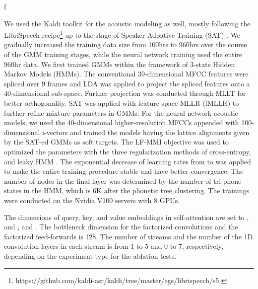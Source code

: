 f\documentclass{article}
\begin{document}
We used the Kaldi toolkit for the acoustic modeling as well, mostly following the LibriSpeech recipe\footnote{https://github.com/kaldi-asr/kaldi/tree/master/egs/librispeech/s5.} up to the stage of Speaker Adpative Training (SAT) \cite{Gales97}. We gradually increased the training data size from 100hrs to 960hrs over the course of the GMM training stages, while the neural network training used the entire 960hr data. We first trained GMMs within the framework of 3-state Hidden Markov Models (HMMs). The conventional 39-dimensional MFCC features were spliced over 9 frames and LDA was applied to project the spliced features onto a 40-dimensional sub-space. Further projection was conducted through MLLT for better orthogonality. SAT was applied with feature-space MLLR (fMLLR) to further refine mixture parameters in GMMs. For the neural network acoustic models, we used the 40-dimensional higher-resolution MFCCs appended with 100-dimensional i-vectors \cite{Dehak11} and trained the models having the lattice alignments given by the SAT-ed GMMs as soft targets. The LF-MMI objective was used to optimized the parameters with the three regularization methods of cross-entropy,  and leaky HMM \cite{Povey16}. The exponential decrease of learning rates from  to  was applied to make the entire training procedure stable and have better convergence. The number of nodes in the final layer was determined by the number of tri-phone states in the HMM, which is 6K after the phonetic tree clustering.  The trainings were conducted on the Nvidia V100 servers with 8  GPUs.  

The dimensions of query, key,  and value embeddings in self-attention are set to , and , and . The bottleneck dimension for the factorized convolutions and the factorized feed-forwards is 128. The number of streams and the number of the 1D convolution layers in each stream is from 1 to 5 and 0 to 7, respectively, depending on the experiment type for the ablation tests.
\end{document}

